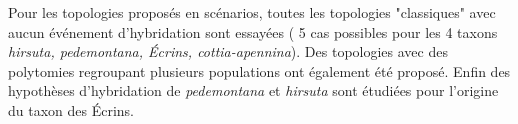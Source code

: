 Pour les topologies proposés en scénarios, toutes les topologies "classiques" avec aucun événement d'hybridation sont essayées ( 5 cas possibles pour les 4 taxons \textit{hirsuta, pedemontana, Écrins, cottia-apennina}). 
Des topologies avec des polytomies regroupant plusieurs populations ont également été proposé. 
Enfin des hypothèses d'hybridation de \textit{pedemontana} et \textit{hirsuta} sont étudiées pour l'origine du taxon des Écrins.
